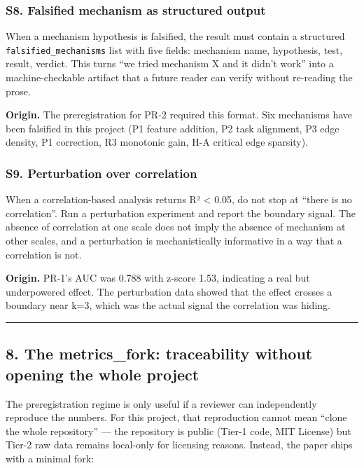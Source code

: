 \documentclass[
]{article}
\begin{document}
\subsubsection{S8. Falsified mechanism as structured
output}\label{s8.-falsified-mechanism-as-structured-output}

When a mechanism hypothesis is falsified, the result must contain a
structured \texttt{falsified\_mechanisms} list with five fields:
mechanism name, hypothesis, test, result, verdict. This turns ``we tried
mechanism X and it didn't work'' into a machine-checkable artifact that
a future reader can verify without re-reading the prose.

\textbf{Origin.} The preregistration for PR-2 required this format. Six
mechanisms have been falsified in this project (P1 feature addition, P2
task alignment, P3 edge density, P1 correction, R3 monotonic gain, H-A
critical edge sparsity).

\subsubsection{S9. Perturbation over
correlation}\label{s9.-perturbation-over-correlation}

When a correlation-based analysis returns R² \textless{} 0.05, do not
stop at ``there is no correlation''. Run a perturbation experiment and
report the boundary signal. The absence of correlation at one scale does
not imply the absence of mechanism at other scales, and a perturbation
is mechanistically informative in a way that a correlation is not.

\textbf{Origin.} PR-1's AUC was 0.788 with z-score 1.53, indicating a
real but underpowered effect. The perturbation data showed that the
effect crosses a boundary near k=3, which was the actual signal the
correlation was hiding.

\begin{center}\rule{0.5\linewidth}{0.5pt}\end{center}

\subsection{8. The metrics\_fork: traceability without opening the whole
project}\label{the-metrics_fork-traceability-without-opening-the-whole-project}

The preregistration regime is only useful if a reviewer can
independently reproduce the numbers. For this project, that reproduction
cannot mean ``clone the whole repository'' --- the repository is public
(Tier-1 code, MIT License) but Tier-2 raw data remains local-only for
licensing reasons. Instead, the paper ships with a minimal fork:
\end{document}
